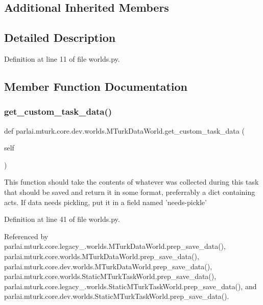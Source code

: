 \subsection*{Additional Inherited Members}


\subsection{Detailed Description}


Definition at line 11 of file worlds.\+py.



\subsection{Member Function Documentation}
\mbox{\label{classparlai_1_1mturk_1_1core_1_1dev_1_1worlds_1_1MTurkDataWorld_af01360aeaa7e6ad524049621551683df}} 
\subsubsection{\texorpdfstring{get\+\_\+custom\+\_\+task\+\_\+data()}{get\_custom\_task\_data()}}
{\footnotesize\ttfamily def parlai.\+mturk.\+core.\+dev.\+worlds.\+M\+Turk\+Data\+World.\+get\+\_\+custom\+\_\+task\+\_\+data (\begin{DoxyParamCaption}\item[{}]{self }\end{DoxyParamCaption})}

\begin{DoxyVerb}This function should take the contents of whatever was collected
during this task that should be saved and return it in some format,
preferrably a dict containing acts. If data needs pickling, put it
in a field named 'needs-pickle'\end{DoxyVerb}
 

Definition at line 41 of file worlds.\+py.



Referenced by parlai.\+mturk.\+core.\+legacy\+\_.\+worlds.\+M\+Turk\+Data\+World.\+prep\+\_\+save\+\_\+data(), parlai.\+mturk.\+core.\+worlds.\+M\+Turk\+Data\+World.\+prep\+\_\+save\+\_\+data(), parlai.\+mturk.\+core.\+dev.\+worlds.\+M\+Turk\+Data\+World.\+prep\+\_\+save\+\_\+data(), parlai.\+mturk.\+core.\+worlds.\+Static\+M\+Turk\+Task\+World.\+prep\+\_\+save\+\_\+data(), parlai.\+mturk.\+core.\+legacy\+\_.\+worlds.\+Static\+M\+Turk\+Task\+World.\+prep\+\_\+save\+\_\+data(), and parlai.\+mturk.\+core.\+dev.\+worlds.\+Static\+M\+Turk\+Task\+World.\+prep\+\_\+save\+\_\+data().

